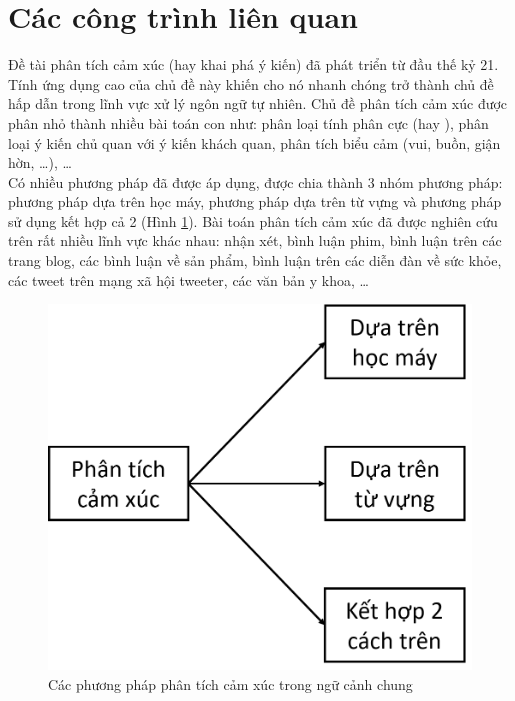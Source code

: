 \section{Các công trình liên quan}
Đề tài phân tích cảm xúc (hay khai phá ý kiến) đã phát triển từ đầu thế kỷ 21. Tính ứng dụng cao của chủ đề này khiến cho nó nhanh chóng trở thành chủ đề hấp dẫn trong lĩnh vực xử lý ngôn ngữ tự nhiên. Chủ đề phân tích cảm xúc được phân nhỏ thành nhiều bài toán con như: phân loại tính phân cực (\tichcuc hay \tieucuc), phân loại ý kiến chủ quan với ý kiến khách quan, phân tích biểu cảm (vui, buồn, giận hờn, \ldots), \ldots\\

Có nhiều phương pháp đã được áp dụng, được chia thành 3 nhóm phương pháp\cite{Silva2015}: phương pháp dựa trên học máy, phương pháp dựa trên từ vựng và phương pháp sử dụng kết hợp cả 2 (Hình \ref{fig:cac-pp-phan-tich}). Bài toán phân tích cảm xúc đã được nghiên cứu trên rất nhiều lĩnh vực khác nhau: nhận xét, bình luận phim, bình luận trên các trang blog, các bình luận về sản phẩm, bình luận trên các diễn đàn về sức khỏe, các tweet trên mạng xã hội tweeter, các văn bản y khoa, \ldots
\begin{figure}
\centering
\includegraphics[scale=0.25]{../hinh/cac_pp_phan_tich.png}
\caption{Các phương pháp phân tích cảm xúc trong ngữ cảnh chung}
\label{fig:cac-pp-phan-tich}
\end{figure}
